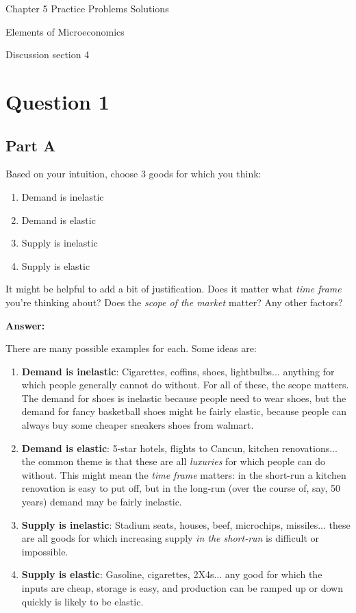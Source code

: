 \documentclass[12pt]{article}
\begin{document}
\begin{center}
\Large Chapter 5 Practice Problems Solutions

\medskip

\normalsize Elements of Microeconomics

\medskip

\small Discussion section 4
\end{center}

\medskip

\section*{Question 1}
\subsection*{Part A}
Based on your intuition, choose 3 goods for which you think:
\begin{enumerate}
    \item Demand is inelastic
    \item Demand is elastic
    \item Supply is inelastic
    \item Supply is elastic
\end{enumerate}
It might be helpful to add a bit of justification. Does it matter what \textit{time frame} you're thinking about? Does the \textit{scope of the market} matter? Any other factors?

\vspace{5mm}

\textbf{Answer:}

\vspace{2mm}

There are many possible examples for each. Some ideas are:
\begin{enumerate}
    \item \textbf{Demand is inelastic}: Cigarettes, coffins, shoes, lightbulbs... anything for which people generally cannot do without. For all of these, the scope matters. The demand for shoes is inelastic because people need to wear shoes, but the demand for fancy basketball shoes might be fairly elastic, because people can always buy some cheaper sneakers shoes from walmart.
    \item \textbf{Demand is elastic}: 5-star hotels, flights to Cancun, kitchen renovations... the common theme is that these are all \textit{luxuries} for which people can do without. This might mean the \textit{time frame} matters: in the short-run a kitchen renovation is easy to put off, but in the long-run (over the course of, say, 50 years) demand may be fairly inelastic.
    \item \textbf{Supply is inelastic}: Stadium seats, houses, beef, microchips, missiles... these are all goods for which increasing supply \textit{in the short-run} is difficult or impossible.
    \item \textbf{Supply is elastic}: Gasoline, cigarettes, 2X4s... any good for which the inputs are cheap, storage is easy, and production can be ramped up or down quickly is likely to be elastic.
\end{enumerate}
\end{document}

